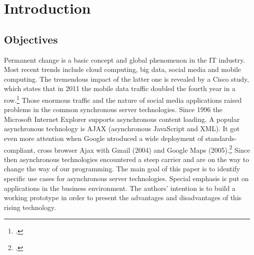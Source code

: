 \listoftables
{}
\newpage


\listoffigures
{}
\newpage

\lstlistoflistings
{}
\newpage

\renewcommand{\thepage}{\arabic{page}}

\setcounter{page}{1} 

\renewcommand{\baselinestretch}{1.4}\normalsize

\section{Introduction}

\subsection{Objectives}
Permanent change is a basic concept and global phenomenon in the IT industry. 
Most recent trends include cloud computing, big data, social media and mobile computing.
The tremendous impact of the latter one is  revealed by a Cisco study, which states that in 2011 the mobile data traffic
doubled the fourth year in a row.\footcite[Cf.]{cisco_2012} Those enormous traffic and the
nature of social media applications raised problems in the common synchronous server technologies.
Since 1996 the Microsoft Internet Explorer supports asynchronous content loading. A popular
asynchronous technology is AJAX (asynchronous JavaScript and XML). It got even more attention when
Google ntroduced a wide deployment of standards-compliant, cross browser Ajax with Gmail (2004) 
and Google Maps (2005).\footcite[Cf.]{Swartz_2005} Since then asynchronous technologies
encountered a steep carrier and are on the way to change the way of our programming.
The main goal of this paper is to identify specific use cases for asynchronous server
technologies. Special emphasis is put on applications in the business environment. 
The authors' intention is to build a working prototype in order to present the advantages and
disadvantages of this rising technology.

